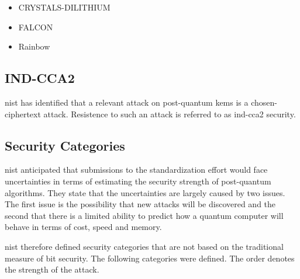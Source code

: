 \begin{itemize}
    \item CRYSTALS-DILITHIUM
    \item FALCON
    \item Rainbow
\end{itemize}

\subsection{IND-CCA2}

\gls{nist} has identified that a relevant attack on post-quantum \glspl{kem} is a chosen-ciphertext attack. Resistence to such an attack is referred to as \gls{ind-cca2} security\cite{nist2017}. 


\subsection{Security Categories}

\gls{nist} anticipated that submissions to the standardization effort would face uncertainties in terms of estimating the security strength of post-quantum algorithms. They state that the uncertainties are largely caused by two issues. The first issue is the possibility that new attacks will be discovered and the second that there is a limited ability to predict how a quantum computer will behave in terms of cost, speed and memory\cite{nist2017}.

\gls{nist} therefore defined security categories that are not based on the traditional measure of bit security. The following categories were defined. The order denotes the strength of the attack\cite{nist2017}.

